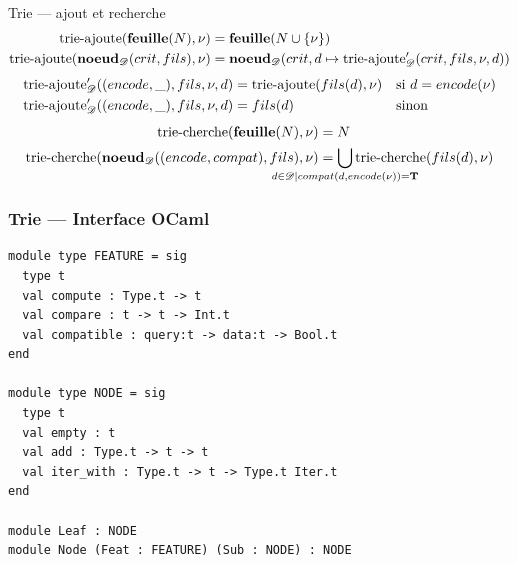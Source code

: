 \documentclass[serif]{beamer}
\newcommand{\mathhyphen}{{\hbox{-}}}
\begin{document}
\begin{frame}{Trie — ajout et recherche}
\scriptsize
\begin{align*}
    \mathrm{trie\mathhyphen ajoute} (\bold{feuille} (N), \nu) &=
    \bold{feuille} (N \cup \{ \nu \})
  \\
    \mathrm{trie\mathhyphen ajoute} (\bold{noeud}_\mathscr{D} (crit, fils), \nu) &=
    \bold{noeud}_\mathscr{D} (crit, d \mapsto \mathrm{trie\mathhyphen ajoute}_\mathscr{D}' (crit, fils, \nu, d))
\end{align*}
\begin{align*}
    \mathrm{trie\mathhyphen ajoute}_\mathscr{D}' ((encode, \_), fils, \nu, d) &=
    \mathrm{trie\mathhyphen ajoute} (fils (d), \nu) &&
    \text{si } d = encode (\nu)
  \\
    \mathrm{trie\mathhyphen ajoute}_\mathscr{D}' ((encode, \_), fils, \nu, d) &=
    fils (d) &&
    \text{sinon}
\end{align*}
\begin{align*}
    \mathrm{trie\mathhyphen cherche} (\bold{feuille} (N), \nu) &=
    N
  \\
    \mathrm{trie\mathhyphen cherche} (\bold{noeud}_\mathscr{D} ((encode, compat), fils), \nu) &=
    \bigcup_{\mathclap{{d \in \mathscr{D} \mid compat (d, encode (\nu)) = \bold{T}}}} \mathrm{trie\mathhyphen cherche} (fils (d), \nu)
\end{align*}
\end{frame}


\begin{frame}[fragile=singleslide]\frametitle{Trie — Interface OCaml}
\footnotesize
\begin{verbatim}
module type FEATURE = sig
  type t
  val compute : Type.t -> t
  val compare : t -> t -> Int.t
  val compatible : query:t -> data:t -> Bool.t
end

module type NODE = sig
  type t
  val empty : t
  val add : Type.t -> t -> t
  val iter_with : Type.t -> t -> Type.t Iter.t
end

module Leaf : NODE
module Node (Feat : FEATURE) (Sub : NODE) : NODE
\end{verbatim}
\end{frame}

\end{document}
